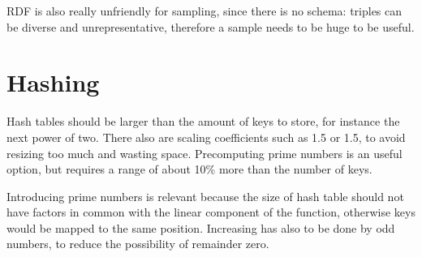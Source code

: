 RDF is also really unfriendly for sampling, since there is no schema: triples can be diverse and unrepresentative, therefore a sample needs to be huge to be useful.

\section{Hashing}
Hash tables should be larger than the amount of keys to store, for instance the next power of two. There also are scaling coefficients such as 1.5 or 1.5, to avoid resizing too much and wasting space. Precomputing prime numbers is an useful option, but requires a range of about 10\% more than the number of keys. 

Introducing prime numbers is relevant because the size of hash table should not have factors in common with the linear component of the function, otherwise keys would be mapped to the same position. Increasing has also to be done by odd numbers, to reduce the possibility of remainder zero. 

 


